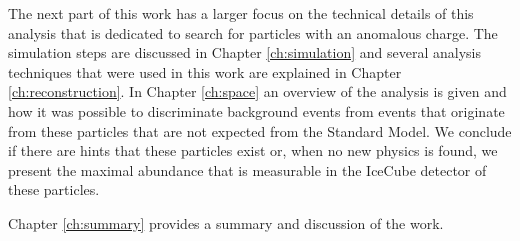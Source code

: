 The next part of this work has a larger focus on the technical details of this analysis that is dedicated to search for particles with an anomalous charge. The simulation steps are discussed in Chapter \ref{ch:simulation} and several analysis techniques that were used in this work are explained in Chapter \ref{ch:reconstruction}. In Chapter \ref{ch:space} an overview of the analysis is given and how it was possible to discriminate background events from events that originate from these particles that are not expected from the Standard Model. We conclude if there are hints that these particles exist or, when no new physics is found, we present the maximal abundance that is measurable in the IceCube detector of these particles.

Chapter \ref{ch:summary} provides a summary and discussion of the work.